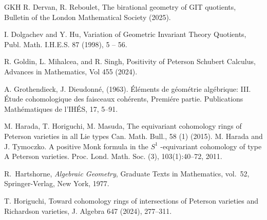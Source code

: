 \documentclass[12pt, reqno]{amsart}
\theoremstyle{plain}
\numberwithin{equation}{section}
\theoremstyle{definition}
\begin{document}
\begin{thebibliography}{GKH}
 R. Dervan, R. Reboulet, The birational geometry of GIT quotients, Bulletin of the London
Mathematical Society (2025).

 I. Dolgachev and Y. Hu, Variation of Geometric Invariant Theory Quotients, Publ. Math. I.H.E.S. 87 (1998),
5 – 56.

 R. Goldin, L. Mihalcea, and R. Singh, Positivity of Peterson Schubert Calculus, Advances in Mathematics, Vol 455 (2024).

     A. Grothendieck,  J. Dieudonn\'e, (1963). \'El\'ements de g\'eom\'etrie alg\'ebrique: III. \'Etude cohomologique des faisceaux coh\'erents, Premi\'ere partie. Publications Math\'ematiques de l'IH\'ES, 17, 5–91. 
    
  M. Harada, T. Horiguchi, M. Masuda, The equivariant cohomology rings of Peterson varieties in all Lie types
Can. Math. Bull., 58 (1) (2015).
     M. Harada and J. Tymoczko. A positive Monk formula in the $S^1$
 -equivariant cohomology of type A Peterson varieties. Proc. Lond. Math. Soc. (3), 103(1):40–72, 2011.

R.~Hartshorne,
\emph{Algebraic Geometry},
Graduate Texts in Mathematics, vol.~52,
Springer-Verlag, New York, 1977.

  T. Horiguchi, Toward cohomology rings of intersections of Peterson varieties and Richardson varieties, J. Algebra 647 (2024), 277–311.
 

\end{thebibliography}
\end{document}
